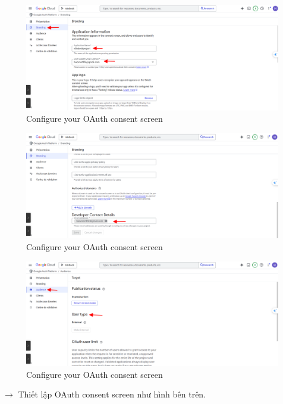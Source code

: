     \begin{figure}[H]
    \centering
    \includegraphics[width=1\textwidth]{images/3thuchi14.png}
    \caption{Configure your OAuth consent screen}
    \end{figure}

    \begin{figure}[H]
    \centering
    \includegraphics[width=1\textwidth]{images/3thuchi16.png}
    \caption{Configure your OAuth consent screen}
    \end{figure}
    
    \begin{figure}[H]
    \centering
    \includegraphics[width=1\textwidth]{images/3thuchi17.png}
    \caption{Configure your OAuth consent screen}
    \end{figure}
    
$\longrightarrow$ Thiết lập OAuth consent screen như hình bên trên.
    
